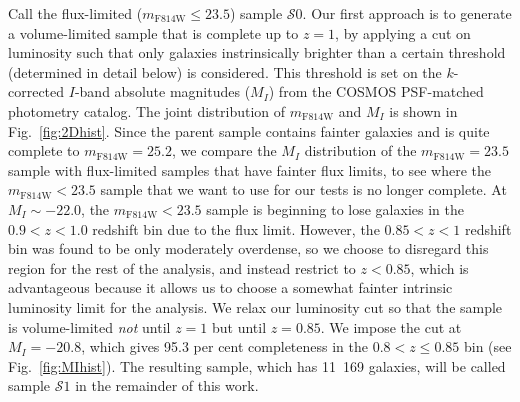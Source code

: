 \documentclass[twocolumn,useAMS,usenatbib]{mn2e}
\newcommand{\s}{\ensuremath{\mathcal{S}}}
\begin{document}
Call the flux-limited ($m_\text{F814W} \le 23.5$) sample \s$0$. Our first approach is to generate a volume-limited sample that is
complete up to $z=1$, by applying a cut on luminosity such that only
galaxies instrinsically brighter than a certain threshold (determined
in detail below) is considered. This threshold is set on the
$k$-corrected $I$-band absolute magnitudes ($M_I$) from the COSMOS PSF-matched
photometry catalog.   The joint distribution of $m_\text{F814W}$ and
$M_I$ is shown in Fig.~\ref{fig:2Dhist}. 
Since the parent sample contains fainter galaxies and is quite
complete to $m_\text{F814W}=25.2$, we compare the $M_I$ distribution
of the $m_\text{F814W}=23.5$ sample with flux-limited samples that
have fainter flux limits, to see where the $m_\text{F814W}<23.5$
sample that we want to use for our tests is no longer complete.
At $M_I\sim-22.0$, the
$m_\text{F814W}<23.5$ sample is beginning to lose galaxies in the
$0.9<z<1.0$ redshift bin due to the flux limit. However, the $0.85<z<1$
redshift bin was found to be only moderately overdense, so we choose
to disregard this region for the rest of the analysis, and instead
restrict to $z<0.85$, which is advantageous because it allows us to
choose a somewhat fainter intrinsic luminosity limit for the
analysis.  We relax our luminosity cut %
so that the sample is volume-limited \emph{not} until $z=1$ but until $z=0.85$. 
We impose the cut at $M_I=-20.8$, which gives 95.3 per cent completeness in
the $0.8 < z \le 0.85$ bin (see Fig.~\ref{fig:MIhist}). The resulting
sample, which has 11~169 galaxies, will be called sample \s$1$ in the remainder
of this work.
\end{document}
